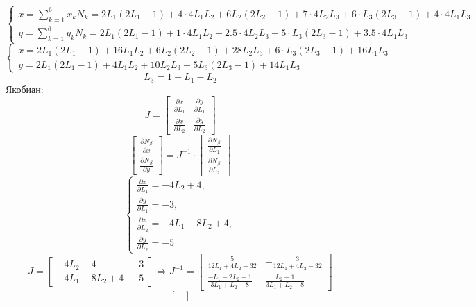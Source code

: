 \documentclass[a4paper, 12pt]{article}
\begin{document}
\begin{enumerate}
\[
    \begin{cases}
		x = \sum \limits_{k=1}^6 x_k N_k = 2L_1 (2L_1 - 1) + 4 \cdot 4L_1L_2 + 6 L_2 (2L_2 - 1) + 7 \cdot 4L_2L_3 + 6 \cdot L_3(2L_3 - 1) + 4 \cdot 4L_1L_3\\
		y= \sum \limits_{k=1}^6 y_k N_k = 2L_1 (2L_1 - 1) + 1 \cdot 4L_1L_2 + 2.5 \cdot 4L_2L_3 + 5 \cdot L_3(2L_3 - 1) + 3.5 \cdot 4L_1L_3
	\end{cases}
\]
\[
    \begin{cases}
		x = 2L_1 (2L_1 - 1) + 16L_1L_2 + 6 L_2 (2L_2 - 1) + 28L_2L_3 + 6 \cdot L_3(2L_3 - 1) + 16L_1L_3\\
		y= 2L_1 (2L_1 - 1) + 4L_1L_2 + 10L_2L_3 + 5 L_3(2L_3 - 1) + 14L_1L_3
	\end{cases}
\]
\[
    L_3 = 1 - L_1 - L_2
\]
Якобиан:
\[
    J = \begin{bmatrix}
        \frac{\partial x}{\partial L_1} & \frac{\partial y}{\partial L_1} \\ 
        \frac{\partial x}{\partial L_2} & \frac{\partial y}{\partial L_2} 
        \end{bmatrix}
\]
\[
	\begin{bmatrix}
		\frac{\partial N_{\beta}}{\partial x} \\ \frac{\partial N_{\beta}}{\partial y}
	\end{bmatrix} = J^{-1} \cdot \begin{bmatrix}
	\frac{\partial N_{\beta}}{\partial L_1} \\ \frac{\partial N_{\beta}}{\partial L_2}
	\end{bmatrix}
\]
\[
\begin{cases}
    \frac{\partial x}{\partial L_1} = -4L_2 + 4,\\
    \frac{\partial y}{\partial L_1} = -3,\\
    \frac{\partial x}{\partial L_2} = -4L_1 -8L_2 + 4,\\
    \frac{\partial y}{\partial L_2} = -5
\end{cases}
\]
\[
    J = \begin{bmatrix}
        -4L_2 - 4 & -3 \\ 
        -4L_1 -8L_2 + 4 & -5 
        \end{bmatrix}
    \Rightarrow
    J^{-1} = \begin{bmatrix}
        \frac{5}{12L_1+4L_2-32} & -\frac{3}{12L_1+4L_2-32} \\
        \frac{-L_1-2L_2+1}{3L_1+L_2-8} & \frac{L_2+1}{3L_1+L_2-8}
    \end{bmatrix}
\]
\[
    \begin{bmatrix}

\end{bmatrix}\]
\end{enumerate}
\end{document}

